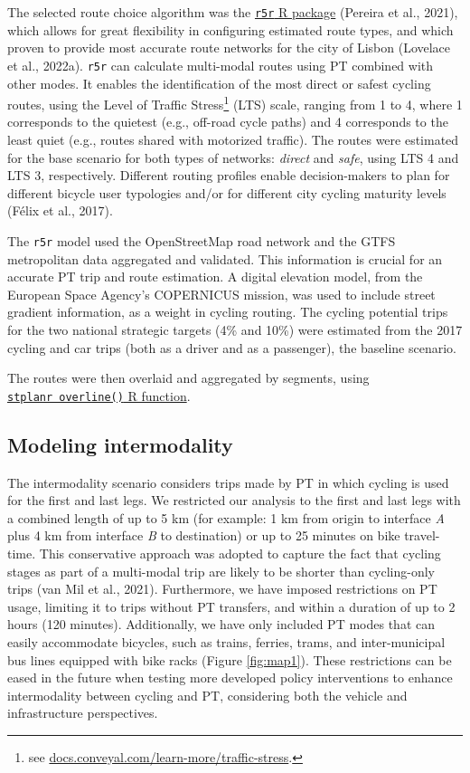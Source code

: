 \documentclass[review, doubleblind, 3p,
authoryear]{elsarticle} %
\begin{document}
The selected route choice algorithm was the
\href{https://ipeagit.github.io/r5r/}{\texttt{r5r} R package} (Pereira
et al., 2021), which allows for great flexibility in configuring
estimated route types, and which proven to provide most accurate route
networks for the city of Lisbon (Lovelace et al., 2022a). \texttt{r5r}
can calculate multi-modal routes using PT combined with other modes. It
enables the identification of the most direct or safest cycling routes,
using the Level of Traffic Stress\footnote{see
  \href{https://docs.conveyal.com/learn-more/traffic-stress}{docs.conveyal.com/learn-more/traffic-stress}.}
(LTS) scale, ranging from 1 to 4, where 1 corresponds to the quietest
(e.g., off-road cycle paths) and 4 corresponds to the least quiet (e.g.,
routes shared with motorized traffic). The routes were estimated for the
base scenario for both types of networks: \emph{direct} and \emph{safe},
using LTS 4 and LTS 3, respectively. Different routing profiles enable
decision-makers to plan for different bicycle user typologies and/or for
different city cycling maturity levels (Félix et al., 2017).

The \texttt{r5r} model used the OpenStreetMap road network and the GTFS
metropolitan data aggregated and validated. This information is crucial
for an accurate PT trip and route estimation. A digital elevation model,
from the European Space Agency's COPERNICUS mission, was used to include
street gradient information, as a weight in cycling routing. The cycling
potential trips for the two national strategic targets (4\% and 10\%)
were estimated from the 2017 cycling and car trips (both as a driver and
as a passenger), the baseline scenario.

The routes were then overlaid and aggregated by segments, using
\href{https://docs.ropensci.org/stplanr/reference/overline.html}{\texttt{stplanr\ overline()}
R function}.

\hypertarget{modeling-intermodality}{%
\subsection{Modeling intermodality}\label{modeling-intermodality}}

The intermodality scenario considers trips made by PT in which cycling
is used for the first and last legs. We restricted our analysis to the
first and last legs with a combined length of up to 5 km (for example: 1
km from origin to interface \emph{A} plus 4 km from interface \emph{B}
to destination) or up to 25 minutes on bike travel-time. This
conservative approach was adopted to capture the fact that cycling
stages as part of a multi-modal trip are likely to be shorter than
cycling-only trips (van Mil et al., 2021). Furthermore, we have imposed
restrictions on PT usage, limiting it to trips without PT transfers, and
within a duration of up to 2 hours (120 minutes). Additionally, we have
only included PT modes that can easily accommodate bicycles, such as
trains, ferries, trams, and inter-municipal bus lines equipped with bike
racks (Figure \ref{fig:map1}). These restrictions can be eased in the
future when testing more developed policy interventions to enhance
intermodality between cycling and PT, considering both the vehicle and
infrastructure perspectives.
\end{document}
